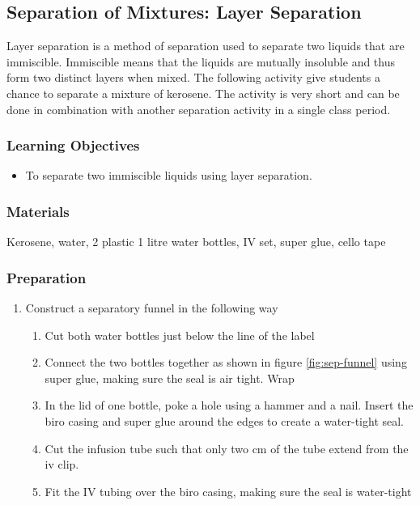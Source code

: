 \subsection{Separation of Mixtures: Layer Separation}
Layer separation is a method of separation used to separate two liquids that are immiscible. Immiscible means that the liquids are mutually insoluble and thus form two distinct layers when mixed. The following activity give students a chance to separate a mixture of kerosene. The activity is very short and can be done in combination with another separation activity in a single class period.

\subsubsection*{Learning Objectives}
\begin{itemize}
\item{To separate two immiscible liquids using layer separation.}
\end{itemize}

\subsubsection*{Materials}
Kerosene, water, 2 plastic 1 litre water bottles, IV set, super glue, cello tape

\subsubsection*{Preparation}
\begin{enumerate}
\item{Construct a separatory funnel in the following way}
\begin{enumerate}
\item{Cut both water bottles just below the line of the label}
\item{Connect the two bottles together as shown in figure \ref{fig:sep-funnel} using super glue, making sure the seal is air tight. Wrap}
\item{In the lid of one bottle, poke a hole using a hammer and a nail. Insert the biro casing and super glue around the edges to create a water-tight seal.}
\item{Cut the infusion tube such that only two cm of the tube extend from the iv clip.}
\item{Fit the IV tubing over the biro casing, making sure the seal is water-tight}
\end{enumerate}
\end{enumerate}

